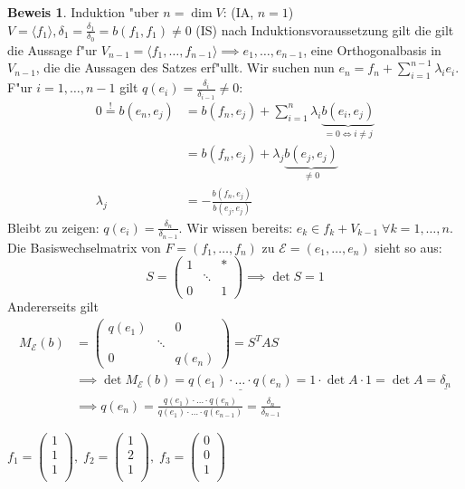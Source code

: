 \documentclass[oneside,fontsize=11pt,paper=a4,BCOR=0mm,DIV=12,automark,headsepline]{scrbook}
\theoremstyle{remark}
\theoremstyle{definition}
\theoremstyle{definition}
\newtheorem*{prof}{Beweis}
\theoremstyle{remark}
\begin{document}
\begin{prof}
  Induktion "uber $n=\dim V$: (IA, $n=1$) $V=\langle f_1 \rangle, \delta_1 = \frac{\delta_1}{\delta_0} = b(f_1, f_1) \neq 0$ (IS) nach Induktionsvoraussetzung gilt die gilt die Aussage f"ur
    $V_{n-1}=\langle f_1,\ldots,f_{n-1} \rangle\implies e_1,\dots, e_{n-1}$, eine Orthogonalbasis in \(V_{n-1}\), die die Aussagen des Satzes erf"ullt. Wir suchen nun \(e_n = f_n + \sum_{i=1}^{n-1}\lambda_i e_i\). F"ur \(i=1,\dots,n-1\) gilt \(q(e_i) = \frac{\delta_i}{\delta_{i-1}} \neq 0\):
      \begin{align*}
        0 \overset{!}{=} b(e_n, e_j) &= b(f_n, e_j) + \sum_{i=1}^n\lambda_i\underbrace{b(e_i,e_j)}_{=0\iff i\neq j} \\
        &= b(f_n, e_j) + \lambda_j\underbrace{b(e_j, e_j)}_{\neq 0} \\
        \lambda_j &= -\frac{b(f_n, e_j)}{b(e_j, e_j)}
      \end{align*}
      Bleibt zu zeigen: \(q(e_i) = \frac{\delta_n}{\delta_{n-1}}\). Wir wissen bereits: \(e_k \in f_k + V_{k-1}\;\forall k=1,\dots,n\). Die Basiswechselmatrix von \(F = (f_1,\dots, f_n)\) zu \(\mathcal{E} = (e_1, \dots, e_n)\) sieht so aus:
      \[ S=
        \begin{pmatrix}
          1 & & * \\
          & \ddots & \\
          0 & & 1
        \end{pmatrix} \implies \det S = 1\]
      Andererseits gilt
      \begin{align*}
        M_{\mathcal{E}}(b) &= \begin{pmatrix}q(e_1) & & 0\\ & \ddots & \\ 0 & & q(e_n)\end{pmatrix} = S^TAS \\
                           &\implies \det M_{\mathcal{E}}(b) = \underline{q(e_1)\cdot\dots\cdot q(e_n)} = 1\cdot\det A\cdot 1 = \det A = \underline{\delta_n} \\
        &\implies q(e_n) = \frac{q(e_1)\cdot\dots\cdot q(e_n)}{q(e_1)\cdot\dots\cdot q(e_{n-1})} = \frac{\delta_n}{\delta_{n-1}}
      \end{align*}
\end{prof}

\begin{exa}
  $f_1=\begin{pmatrix}1\\ 1\\ 1\\\end{pmatrix},\;f_2=\begin{pmatrix}1\\ 2\\ 1\\\end{pmatrix},\;f_3=\begin{pmatrix}0\\ 0\\ 1\\\end{pmatrix}$
\end{exa}
\end{document}
